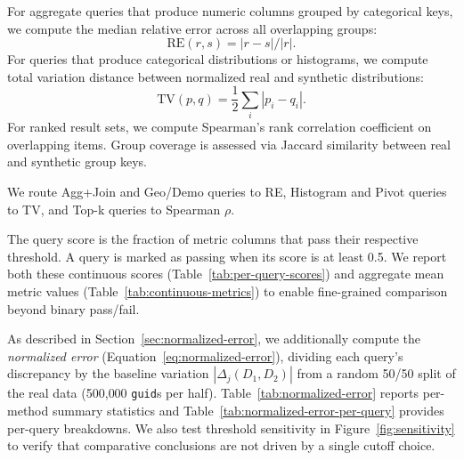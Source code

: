\documentclass[12pt,letterpaper]{article}
\renewcommand{\_}{\textunderscore\allowbreak}
\begin{document}
For aggregate queries that produce numeric columns grouped by categorical keys, we compute the median relative error across all overlapping groups:
\begin{equation}
    \text{RE}(r, s) = |r - s| / |r|.
\end{equation}
For queries that produce categorical distributions or histograms, we compute total variation distance between normalized real and synthetic distributions:
\begin{equation}
    \text{TV}(p, q) = \frac{1}{2} \sum_i |p_i - q_i|.
\end{equation}
For ranked result sets, we compute Spearman's rank correlation coefficient on overlapping items. Group coverage is assessed via Jaccard similarity between real and synthetic group keys.

We route Agg+Join and Geo/Demo queries to RE, Histogram and Pivot queries to TV, and Top-k queries to Spearman $\rho$.

The query score is the fraction of metric columns that pass their respective threshold. A query is marked as passing when its score is at least 0.5. We report both these continuous scores (Table~\ref{tab:per-query-scores}) and aggregate mean metric values (Table~\ref{tab:continuous-metrics}) to enable fine-grained comparison beyond binary pass/fail.

As described in Section~\ref{sec:normalized-error}, we additionally compute the \textit{normalized error} (Equation~\ref{eq:normalized-error}), dividing each query's discrepancy by the baseline variation $|\Delta_j(D_1, D_2)|$ from a random 50/50 split of the real data (500{,}000 \texttt{guid}s per half). Table~\ref{tab:normalized-error} reports per-method summary statistics and Table~\ref{tab:normalized-error-per-query} provides per-query breakdowns. We also test threshold sensitivity in Figure~\ref{fig:sensitivity} to verify that comparative conclusions are not driven by a single cutoff choice.
\end{document}
